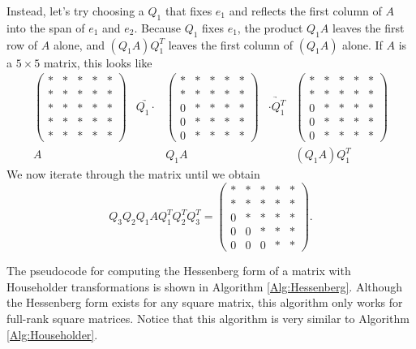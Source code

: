 Instead, let's try choosing a $Q_1$ that fixes $e_1$ and reflects the first column of $A$ into the span of $e_1$ and $e_2$. 
Because $Q_1$ fixes $e_1$, the product $Q_1A$ leaves the first row of $A$ alone, and $(Q_1A)Q_1^T$ leaves the first column of $(Q_1A)$ alone.
If $A$ is a $5 \times 5$ matrix, this looks like
\[
\begin{array}{ccccc}
\begin{pmatrix}
* & * & * & * & * \\
* & * & * & * & * \\
* & * & * & * & * \\
* & * & * & * & * \\
* & * & * & * & *
\end{pmatrix}
&\underrightarrow{Q_1 \cdot }&
\begin{pmatrix}
* & * & * & * & * \\
* & * & * & * & * \\
0 & * & * & * & * \\
0 & * & * & * & * \\
0 & * & * & * & *
\end{pmatrix}
&\underrightarrow{\cdot Q_1^T }&
\begin{pmatrix}
* & * & * & * & * \\
* & * & * & * & * \\
0 & * & * & * & * \\
0 & * & * & * & * \\
0 & * & * & * & *
\end{pmatrix}
\\
A & & Q_1A & & (Q_1 A) Q_1^T
  \end{array}
\]
We now iterate through the matrix until we obtain
\begin{equation*}
Q_3 Q_2 Q_1 A Q_1^T Q_2 ^T Q_3^T =
\begin{pmatrix}
* & * & * & * & * \\
* & * & * & * & * \\
0 & * & * & * & * \\
0 & 0 & * & * & * \\
0 & 0 & 0 & * & *
\end{pmatrix}.
\end{equation*}

The pseudocode for computing the Hessenberg form of a matrix with Householder transformations is shown in Algorithm \ref{Alg:Hessenberg}.
Although the Hessenberg form exists for any square matrix, this algorithm only works for full-rank square matrices.
Notice that this algorithm is very similar to Algorithm \ref{Alg:Householder}.


